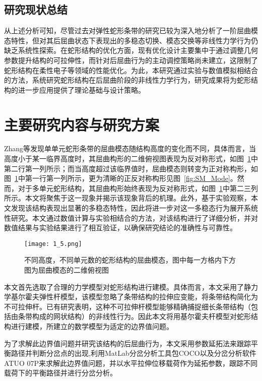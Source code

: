 \subsection{研究现状总结}
从上述分析可知，尽管过去对弹性蛇形条带的研究已较为深入地分析了一阶屈曲模态特性，但对其后屈曲状态下表现出的多稳态切换、模态交换等非线性力学行为仍缺乏系统性探索。在蛇形结构的优化方面，现有优化设计主要集中于通过调整几何参数提升结构的可拉伸性，而针对后屈曲行为的主动调控策略尚未建立，这限制了蛇形结构在柔性电子等领域的性能优化。为此，本研究通过实验与数值模拟相结合的方法，系统研究蛇形结构在后屈曲阶段的非线性力学行为，研究成果将为蛇形结构的进一步应用提供了理论基础与设计策略。

\section{主要研究内容与研究方案}
Zhang等\cite{zhang2013buckling}发现单单元蛇形条带的屈曲模态随结构高度的变化而不同，具体而言，当高度小于某一临界高度时，其屈曲构形的二维俯视图表现为反对称形式，如图~\ref{fig:1_5}中第二行第一列所示；而当高度超过该临界值时，屈曲模态则转变为正对称构形，如图~\ref{fig:1_5}中第一行第一列所示，更为清晰的正反对称构形见图~\ref{fig:SM_Mode}。然而，对于多单元蛇形结构，其屈曲构形始终表现为反对称形式，如图~\ref{fig:1_5}中第二三列所示。本文将聚焦于这一现象并揭示该现象背后的机理。此外，基于实验观察，本文发现该结构表现出显著的多稳态特性，因此将进一步对这一多稳态行为展开系统性研究。本文通过数值计算与实验相结合的方法，对该结构进行了详细分析，并对数值结果与实验结果进行了相互验证，以确保研究结论的准确性与可靠性。
\begin{figure}
	\centering
	\texttt{[image: 1\_5.png]}
	\caption{不同高度，不同单元数的蛇形结构的屈曲模态，图中每一方格内下方图为屈曲模态的二维俯视图\cite{zhang2013buckling}}
	\label{fig:1_5}
\end{figure}

本文首先选取了合理的力学模型对蛇形结构进行建模。具体而言，本文采用了静力学基尔霍夫弹性杆模型\cite{dill1992kirchhoff}，该模型忽略了条带结构的拉伸应变能，将条带结构简化为不可拉伸杆。已有研究表明，这种不可拉伸杆模型能够精确捕捉细长条带结构（包括由条带构成的网状结构）的非线性行为\cite{yu2019bifurcations,yu2021numerical}。因此本文将用基尔霍夫杆模型对蛇形结构进行建模，所建立的数学模型为适定的边界值问题。

为了求解此边界值问题并研究该结构的后屈曲行为，本文采用参数延拓法来跟踪平衡路径并判断分岔点的出现\cite{yu2019bifurcations,ahsan2022methods},利用MatLab分岔分析工具包COCO\cite{dankowicz2013recipes}以及分岔分析软件ATUO 07P\cite{doedel2007auto}来求解此边界值问题，并以水平拉伸位移载荷作为延拓参数，跟踪不同载荷下的平衡路径并进行分岔分析。

